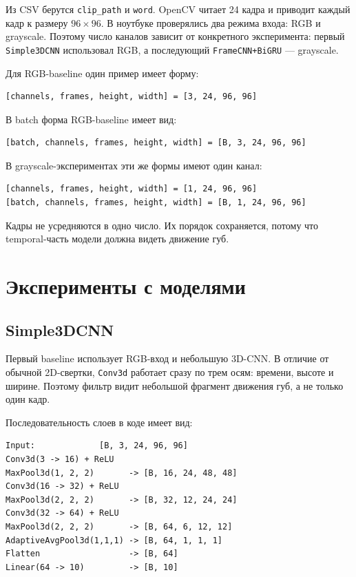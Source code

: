 \documentclass[12pt,a4paper]{article}
\begin{document}
Из CSV берутся \texttt{clip\_path} и \texttt{word}. OpenCV читает 24 кадра
и приводит каждый кадр к размеру $96 \times 96$. В ноутбуке проверялись два
режима входа: RGB и grayscale. Поэтому число каналов зависит от конкретного
эксперимента: первый \texttt{Simple3DCNN} использовал RGB, а последующий
\texttt{FrameCNN+BiGRU} --- grayscale.

Для RGB-baseline один пример имеет форму:

\begin{verbatim}
[channels, frames, height, width] = [3, 24, 96, 96]
\end{verbatim}

В batch форма RGB-baseline имеет вид:

\begin{verbatim}
[batch, channels, frames, height, width] = [B, 3, 24, 96, 96]
\end{verbatim}

В grayscale-экспериментах эти же формы имеют один канал:

\begin{verbatim}
[channels, frames, height, width] = [1, 24, 96, 96]
[batch, channels, frames, height, width] = [B, 1, 24, 96, 96]
\end{verbatim}

Кадры не усредняются в одно число. Их порядок сохраняется, потому что
temporal-часть модели должна видеть движение губ.

\section{Эксперименты с моделями}

\subsection{Simple3DCNN}

Первый baseline использует RGB-вход и небольшую 3D-CNN. В отличие от
обычной 2D-свертки, \texttt{Conv3d} работает сразу по трем осям: времени,
высоте и ширине. Поэтому фильтр видит небольшой фрагмент движения губ, а не
только один кадр.

Последовательность слоев в коде имеет вид:

\begin{verbatim}
Input:             [B, 3, 24, 96, 96]
Conv3d(3 -> 16) + ReLU
MaxPool3d(1, 2, 2)       -> [B, 16, 24, 48, 48]
Conv3d(16 -> 32) + ReLU
MaxPool3d(2, 2, 2)       -> [B, 32, 12, 24, 24]
Conv3d(32 -> 64) + ReLU
MaxPool3d(2, 2, 2)       -> [B, 64, 6, 12, 12]
AdaptiveAvgPool3d(1,1,1) -> [B, 64, 1, 1, 1]
Flatten                  -> [B, 64]
Linear(64 -> 10)         -> [B, 10]
\end{verbatim}
\end{document}
